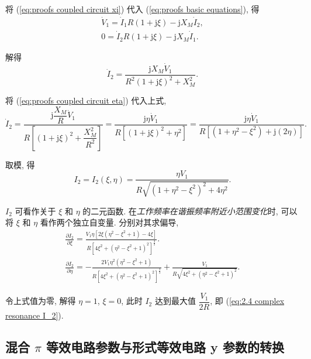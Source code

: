 将 (\ref{eq:proofs coupled circuit xi}) 代入 (\ref{eq:proofs basic equations}), 得
\begin{gather}
    \dot{V}_1=\dot{I}_1R(1+\mathrm{j}\xi)-\mathrm{j}X_M\dot{I}_2, \\
    0=\dot{I}_2R(1+\mathrm{j}\xi)-\mathrm{j}X_M\dot{I}_1.
\end{gather}

解得
\begin{equation}
    \dot{I}_2=\frac{\mathrm{j}X_M\dot{V}_1}{R^2(1+\mathrm{j}\xi)^2+X_M^2}.
\end{equation}

将 (\ref{eq:proofs coupled circuit eta}) 代入上式,
\begin{equation}
    \dot{I}_2=\frac{\mathrm{j}\dfrac{X_M}{R}\dot{V}_1}{R\left[(1+\mathrm{j}\xi)^2+\dfrac{X_M^2}{R^2}\right]}=\frac{\mathrm{j}\eta\dot{V}_1}{R[(1+\mathrm{j}\xi)^2+\eta^2]}=\frac{\mathrm{j}\eta\dot{V}_1}{R[(1+\eta^2-\xi^2)+\mathrm{j}(2\eta)]}.
\end{equation}

取模, 得
\begin{equation}
    I_2=I_2(\xi,\eta)=\frac{\eta V_1}{R\sqrt{(1+\eta^2-\xi^2)^2+4\eta^2}}.
\end{equation}

$I_2$ 可看作关于 $\xi$ 和 $\eta$ 的二元函数. 在\textit{工作频率在谐振频率附近小范围变化}时, 可以将 $\xi$ 和 $\eta$ 看作两个独立自变量. 分别对其求偏导,
\begin{gather}
    \frac{\partial I_2}{\partial\xi}=\frac{V_{1} \eta \left[2 \xi \left(\eta^{2} - \xi^{2} + 1\right) - 4 \xi\right]}{R \left[4 \xi^{2} + \left(\eta^{2} - \xi^{2} + 1\right)^{2}\right]^{\frac{3}{2}}}. \\
    \frac{\partial I_2}{\partial\eta}=- \frac{2 V_{1} \eta^{2} \left(\eta^{2} - \xi^{2} + 1\right)}{R \left[4 \xi^{2} + \left(\eta^{2} - \xi^{2} + 1\right)^{2}\right]^{\frac{3}{2}}} + \frac{V_{1}}{R \sqrt{4 \xi^{2} + \left(\eta^{2} - \xi^{2} + 1\right)^{2}}}.
\end{gather}

令上式值为零, 解得 $\eta=1$, $\xi=0$, 此时 $I_2$ 达到最大值 $\dfrac{V_1}{2R}$, 即 (\ref{eq:2.4 complex resonance I_2}).

\subsection{混合 \texorpdfstring{$\pi$}{pi} 等效电路参数与形式等效电路 y 参数的转换} \label{proofs 混合 pi 等效电路参数与形式等效电路 y 参数的转换}

